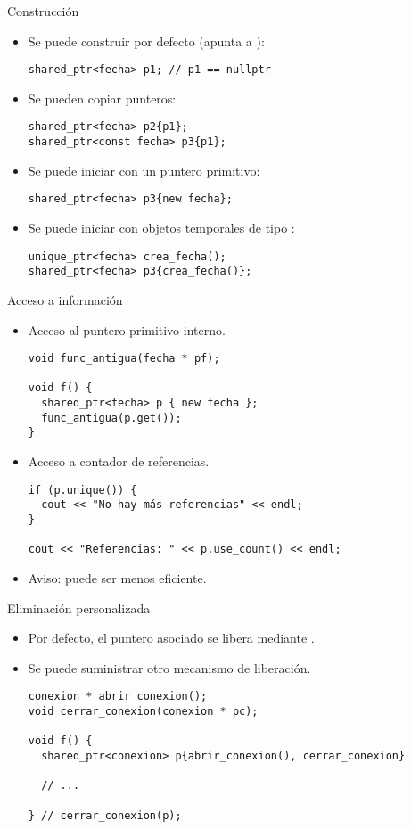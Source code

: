 \begin{frame}[fragile]{Construcción}
\begin{itemize}
  \item Se puede construir por defecto (apunta a ):
\begin{lstlisting}
shared_ptr<fecha> p1; // p1 == nullptr
\end{lstlisting}
  \item Se pueden copiar punteros:
\begin{lstlisting}
shared_ptr<fecha> p2{p1};
shared_ptr<const fecha> p3{p1};
\end{lstlisting}
  \item Se puede iniciar con un puntero primitivo:
\begin{lstlisting}
shared_ptr<fecha> p3{new fecha};
\end{lstlisting}
  \item Se puede iniciar con objetos temporales de tipo :
\begin{lstlisting}
unique_ptr<fecha> crea_fecha();
shared_ptr<fecha> p3{crea_fecha()};
\end{lstlisting}
\end{itemize}
\end{frame}

\begin{frame}[fragile]{Acceso a información}
\begin{itemize}
  \item Acceso al puntero primitivo interno.
\begin{lstlisting}
void func_antigua(fecha * pf);

void f() {
  shared_ptr<fecha> p { new fecha };
  func_antigua(p.get());
}
\end{lstlisting}
  \item Acceso a contador de referencias.
\begin{lstlisting}
if (p.unique()) {
  cout << "No hay más referencias" << endl;
}

cout << "Referencias: " << p.use_count() << endl;
\end{lstlisting}
  \item \alert{Aviso}:  puede ser menos eficiente.
\end{itemize}
\end{frame}

\begin{frame}[fragile]{Eliminación personalizada}
\begin{itemize}
  \item Por defecto, el puntero asociado se libera mediante .
  \item Se puede suministrar otro mecanismo de liberación.
\begin{lstlisting}
conexion * abrir_conexion();
void cerrar_conexion(conexion * pc);

void f() {
  shared_ptr<conexion> p{abrir_conexion(), cerrar_conexion}
  
  // ...

} // cerrar_conexion(p);
\end{lstlisting}
\end{itemize}
\end{frame}

